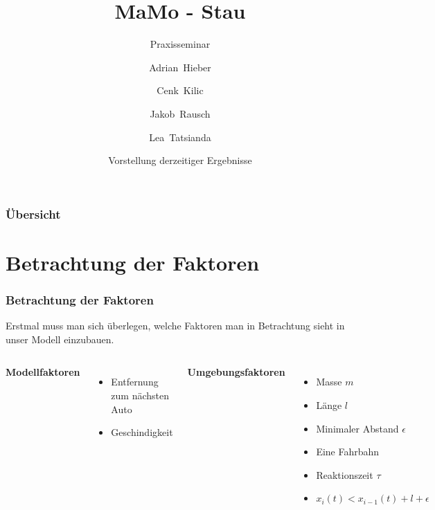 \documentclass{beamer}
\title[MaMo - Stau] %
{MaMo - Stau}
\subtitle{Praxisseminar}
\author[Hieber, Kilic, Rausch, Tatsianda] %
{Adrian~Hieber \and Cenk~Kilic \and Jakob~Rausch \and Lea~Tatsianda}
\date[\today] %
{Vorstellung derzeitiger Ergebnisse}
\begin{document}
\frame{\titlepage}


\begin{frame}
\frametitle{Übersicht}
\tableofcontents
\end{frame}


\section{Betrachtung der Faktoren}

\begin{frame}
\frametitle{Betrachtung der Faktoren}
Erstmal muss man sich überlegen, welche Faktoren man in Betrachtung sieht in unser Modell einzubauen. 
\newline

\begin{columns}

\textbf{Modellfaktoren}
\begin{itemize}
    \item<2-> Entfernung zum nächsten Auto
    \item<2-> Geschindigkeit
\end{itemize}

\textbf{Umgebungsfaktoren}
\begin{itemize}
    \item<3-> Masse $m$
    \item<3-> Länge $l$
    \item<3-> Minimaler Abstand $\epsilon$
    \item<3-> Eine Fahrbahn
    \item<3-> Reaktionszeit $\tau$
    \item<3-> $x_{i}(t) < x_{i-1}(t)+l+\epsilon$
\end{itemize}

\end{columns}
\end{frame}




\end{document}
